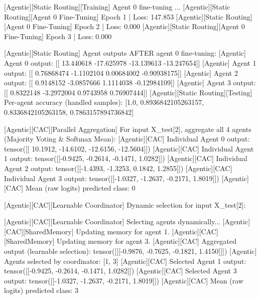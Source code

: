 [Agentic][Static Routing][Training] Agent 0 fine-tuning ...
[Agentic][Static Routing][Agent 0 Fine-Tuning] Epoch 1 | Loss: 147.853
[Agentic][Static Routing][Agent 0 Fine-Tuning] Epoch 2 | Loss: 0.000
[Agentic][Static Routing][Agent 0 Fine-Tuning] Epoch 3 | Loss: 0.000

[Agentic][Static Routing] Agent outputs AFTER agent 0 fine-tuning:
[Agentic] Agent 0 output: [[ 13.440618 -17.625978 -13.139613 -13.247654]]
[Agentic] Agent 1 output: [[ 0.76868474 -1.1102104   0.00684002 -0.90938175]]
[Agentic] Agent 2 output: [[ 0.9148152  -3.0857666   1.1114038  -0.12984109]]
[Agentic] Agent 3 output: [[ 0.8322148  -3.2972004   0.9743958   0.76907444]]
[Agentic][Static Routing][Testing] Per-agent accuracy (handled samples): [1.0, 0.8936842105263157, 0.8336842105263158, 0.7863157894736842]

[Agentic][CAC][Parallel Aggregation] For input X_test[2], aggregate all 4 agents (Majority Voting & Softmax Mean):
[Agentic][CAC] Individual Agent 0 output: tensor([[ 10.1912, -14.6102, -12.6156, -12.5604]])
[Agentic][CAC] Individual Agent 1 output: tensor([[-0.9425, -0.2614, -0.1471,  1.0282]])
[Agentic][CAC] Individual Agent 2 output: tensor([[-1.4393, -1.3253,  0.1842,  1.2855]])
[Agentic][CAC] Individual Agent 3 output: tensor([[-1.0327, -1.2637, -0.2171,  1.8019]])
[Agentic][CAC] Mean (raw logits) predicted class: 0

[Agentic][CAC][Learnable Coordinator] Dynamic selection for input X_test[2]:

[Agentic][CAC][Learnable Coordinator] Selecting agents dynamically...
[Agentic][CAC][SharedMemory] Updating memory for agent 1.
[Agentic][CAC][SharedMemory] Updating memory for agent 3.
[Agentic][CAC] Aggregated output (learnable selection): tensor([[[-0.9876, -0.7625, -0.1821,  1.4150]]])
[Agentic] Agents selected by coordinator: [1, 3]
[Agentic][CAC] Selected Agent 1 output: tensor([[-0.9425, -0.2614, -0.1471,  1.0282]])
[Agentic][CAC] Selected Agent 3 output: tensor([[-1.0327, -1.2637, -0.2171,  1.8019]])
[Agentic][CAC] Mean (raw logits) predicted class: 3